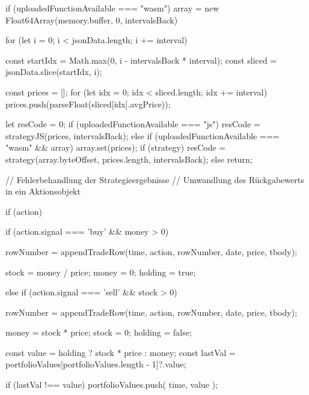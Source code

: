 \begin{JsCode}[caption={Backtestlogik}, label={lst:Backtestlogik}]
    if (uploadedFunctionAvailable === "wasm") {
        array = new Float64Array(memory.buffer, 0, intervalsBack)
    }

    for (let i = 0; i < jsonData.length; i += interval) {
        const startIdx = Math.max(0, i - intervalsBack * interval);
        const sliced = jsonData.slice(startIdx, i);

        const prices = [];
        for (let idx = 0; idx < sliced.length; idx += interval) {
            prices.push(parseFloat(sliced[idx].avgPrice));
        }

        let resCode = 0;
        if (uploadedFunctionAvailable === "js") {
            resCode = strategyJS(prices, intervalsBack);
        } else if (uploadedFunctionAvailable === "wasm" && array) {
            array.set(prices);
            if (strategy) {
                resCode = strategy(array.byteOffset, prices.length, intervalsBack);
            }
        } else {
            return;
        }

        // Fehlerbehandlung der Strategieergebnisse
        // Umwandlung des Rückgabewerts in ein Aktionsobjekt

        if (action) {
            if (action.signal === 'buy' && money > 0) {
                rowNumber = appendTradeRow(time, action, rowNumber, date, price, tbody);

                stock = money / price;
                money = 0;
                holding = true;
            } else if (action.signal === 'sell' && stock > 0) {
                rowNumber = appendTradeRow(time, action, rowNumber, date, price, tbody);

                money = stock * price;
                stock = 0;
                holding = false;
            }
        }

        const value = holding ? stock * price : money;
        const lastVal = portfolioValues[portfolioValues.length - 1]?.value;
        
        if (lastVal !== value) {
            portfolioValues.push({ time, value });
        }
    }
\end{JsCode}

